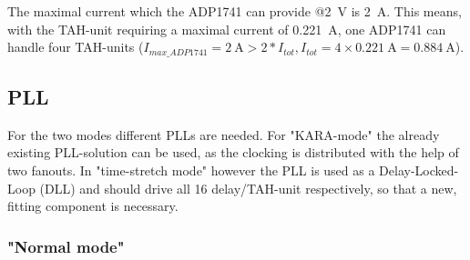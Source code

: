 The maximal current which the ADP1741 can provide @\SI{2}{\volt} is \SI{2}{\ampere}. This means, with the TAH-unit requiring a maximal current of \SI{0.221}{\ampere}, one ADP1741 can handle four TAH-units ($I_{max\_ADP1741} = \SI{2}{\ampere} > 2 * I_{tot}, I_{tot} = 4 \times \SI{0.221}{\ampere} =  \SI{0.884}{\ampere}$).

\subsection{PLL}
For the two modes different PLLs are needed. For "KARA-mode" the already existing PLL-solution can be used, as the clocking is distributed with the help of two fanouts. 
In "time-stretch mode" however the PLL is used as a Delay-Locked-Loop (DLL) and should drive all 16 delay/TAH-unit respectively, so that a new, fitting component is necessary.
\subsubsection{"Normal mode"}
